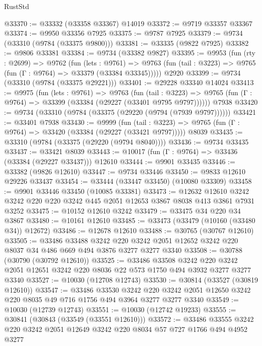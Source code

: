 \begin{lexlean}{RustStd}
\begin{coremodule}
@33370 := @33332 (@33358 @33367) @14019
@33372 := @9719 @33357 @33367
@33374 := @9950 @33356 @7925
@33375 := @9787 @7925
@33379 := @9734 (@33310 (@9784 (@33375 @9800)))
@33381 := @33335 (@9822 @7925)
@33382 := @9806 @33381
@33384 := @9734 (@33382 @9827)
@33395 := @9953
    (fun (rty : @2699) =>
    @9762
      (fun (lets : @9761) =>
      @9763 (fun (tail : @3223) => @9765 (fun (Γ : @9764) => @33379 (@33384 @33345)))))
    @2920
@33399 := @9734 (@33310 (@9784 (@33375 @29221)))
@33401 := @29228 @33340 @14024
@33413 := @9975
    (fun (lets : @9761) =>
    @9763
      (fun (tail : @3223) =>
      @9765 (fun (Γ : @9764) => @33399 (@33384 (@29227 (@33401 @9795 @9797))))))
    @7938
@33420 := @9734 (@33310 (@9784 (@33375 (@29220 (@9794 (@7939 @9797))))))
@33421 := @33401 @7938
@33430 := @9999
    (fun (tail : @3223) => @9765 (fun (Γ : @9764) => @33420 (@33384 (@29227 (@33421 @9797)))))
    @8039
@33435 := @33310 (@9784 (@33375 (@29220 (@9794 @8040))))
@33436 := @9734 @33435
@33437 := @33421 @8039
@33443 := @10017 (fun (Γ : @9764) => @33436 (@33384 (@29227 @33437))) @12610
@33444 := @9901 @33435
@33446 := @33382 (@9826 @12610)
@33447 := @9734 @33446
@33450 := @9833 @12610 @29226 @33437
@33454 := @33444 (@33447 @33450) (@10080 @33309)
@33458 := @9901 @33446 @33450 (@10085 @33381)
@33473 := @12632
    @12610
    @3242
    @3242
    @220
    @220
    @3242
    @445
    @2051
    @12653
    @3867
    @8038
    @413
    @3861
    @7931
    @3252
@33475 := @10152 @12610 @3242
@33479 := @33475 @34 @220 @34 @3867
@33480 := @10161 @12610
@33485 := @33473 (@33479 (@10160 (@33480 @34)) @12672)
@33486 := @12678 @12610
@33488 := @30765 (@30767 @12610)
@33505 := @33486
    @33488
    @3242
    @220
    @3242
    @2051
    @12652
    @3242
    @220
    @8037
    @34
    @486
    @669
    @494
    @3876
    @3277
    @3277
    @3340
@33508 := @30788 (@30790 (@30792 @12610))
@33525 := @33486
    @33508
    @3242
    @220
    @3242
    @2051
    @12651
    @3242
    @220
    @8036
    @22
    @573
    @1750
    @494
    @3932
    @3277
    @3277
    @3340
@33527 := @10030 (@12708 @12743)
@33530 := @30814 (@33527 (@30819 @12610))
@33547 := @33486
    @33530
    @3242
    @220
    @3242
    @2051
    @12650
    @3242
    @220
    @8035
    @49
    @716
    @1756
    @494
    @3964
    @3277
    @3277
    @3340
@33549 := @10030 (@12739 @12743)
@33551 := @10030 (@12742 @19233)
@33555 := @30841 (@30843 (@33549 (@33551 @12610)))
@33572 := @33486
    @33555
    @3242
    @220
    @3242
    @2051
    @12649
    @3242
    @220
    @8034
    @57
    @727
    @1766
    @494
    @4952
    @3277

\end{coremodule}
\end{lexlean}
